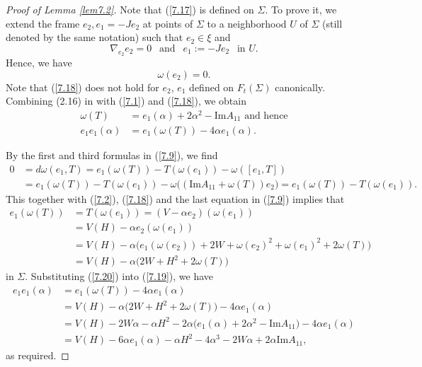 \documentclass{amsart}
\theoremstyle{Corollary}
\numberwithin{equation}{section}
\begin{document}
\begin{proof}[Proof of Lemma \ref{lem7.2}]
Note that (\ref{7.17}) is defined on $\Sigma$. 
To prove it, we extend the frame $e_2, e_1=-Je_2$
at points of $\Sigma$ to a neighborhood $U$ of $\Sigma$
(still denoted by the same notation) such that
$e_2\in\xi$ and 
$$\nabla_{e_2}e_2=0~~\mbox{ and }~~
e_1:=-Je_2~~\mbox{ in }U.$$
Hence, we have 
\begin{equation}\label{7.18}
\omega(e_2)=0.
\end{equation}
Note that 
(\ref{7.18}) does not hold for $e_2$, $e_1$ defined on $F_t(\Sigma)$ canonically. 
Combining (2.16) in \cite{CYZ} with (\ref{7.1}) and (\ref{7.18}), we obtain 
\begin{equation}\label{7.19}
\begin{split}
   \omega(T) & =e_1(\alpha)+2\alpha^2-\mbox{Im}A_{11}\mbox{ and hence}\\
    e_1e_1(\alpha) &=e_1(\omega(T))-4\alpha e_1(\alpha). 
\end{split}
\end{equation}

By the first and third formulas in (\ref{7.9}), we find
\begin{equation*}
\begin{split}
0&=d\omega(e_1,T)=e_1(\omega(T))-T(\omega(e_1))-\omega([e_1,T])\\
&=e_1(\omega(T))-T(\omega(e_1))-\omega\big((\mbox{Im}A_{11}+\omega(T))e_2\big)
=e_1(\omega(T))-T(\omega(e_1)).
\end{split}
\end{equation*}
This together with  
(\ref{7.2}), (\ref{7.18}) and the last equation in (\ref{7.9})
implies that 
\begin{equation}\label{7.20}
\begin{split}
e_1(\omega(T))&=T(\omega(e_1))=(V-\alpha e_2)(\omega(e_1))\\
&=V(H)-\alpha e_2(\omega(e_1))\\
&=V(H)-\alpha \big(e_1(\omega(e_2))+2W+\omega(e_2)^2+\omega(e_1)^2+2\omega(T)\big)\\
&=V(H)-\alpha\big(2W+H^2+2\omega(T)\big)
\end{split}
\end{equation}
in $\Sigma$. 
Substituting (\ref{7.20}) into (\ref{7.19}), 
we have 
\begin{equation*}
\begin{split}
 e_1e_1(\alpha) &=e_1(\omega(T))-4\alpha e_1(\alpha)\\
 &=V(H)-\alpha\big(2W+H^2+2\omega(T)\big)-4\alpha e_1(\alpha)\\
 &=V(H)-2W\alpha-\alpha H^2
 -2\alpha\big(e_1(\alpha)+2\alpha^2-\mbox{Im}A_{11}\big)
 -4\alpha e_1(\alpha)\\
 &=V(H)-6\alpha e_1(\alpha)-\alpha H^2-4\alpha^3-2W\alpha+2\alpha \mbox{Im}A_{11}, 
\end{split}
\end{equation*}
as required. 
\end{proof}
\end{document}
